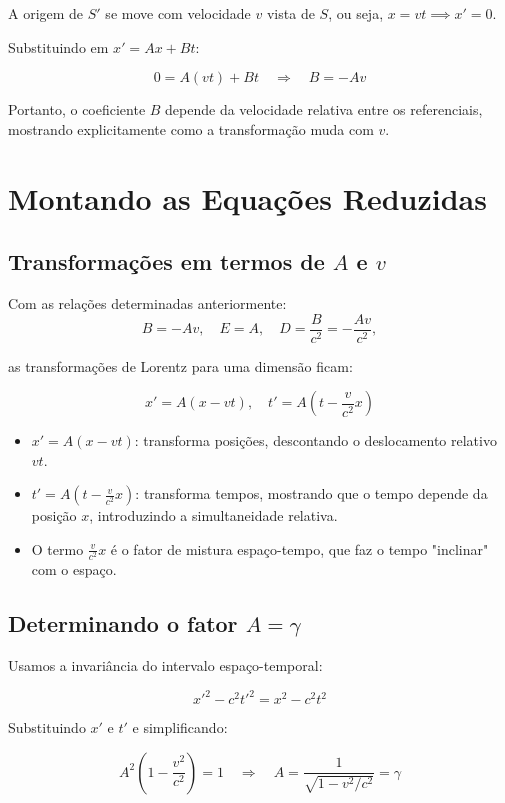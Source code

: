 \documentclass[12pt,a4paper]{article}
\begin{document}
A origem de $S'$ se move com velocidade $v$ vista de $S$, ou seja, $x = v t \implies x' = 0$.  

Substituindo em $x' = A x + B t$:

\[
0 = A (v t) + B t \quad \Rightarrow \quad B = - A v
\]

Portanto, o coeficiente $B$ depende da velocidade relativa entre os referenciais, mostrando explicitamente como a transformação muda com $v$.

\section{Montando as Equações Reduzidas}

\subsection{Transformações em termos de $A$ e $v$}

Com as relações determinadas anteriormente:
\[
B = -A v, \quad E = A, \quad D = \frac{B}{c^2} = -\frac{A v}{c^2},
\]

as transformações de Lorentz para uma dimensão ficam:

\[
x' = A (x - v t), \quad t' = A \left(t - \frac{v}{c^2} x \right)
\]

\begin{itemize}
    \item $x' = A (x - v t)$: transforma posições, descontando o deslocamento relativo $v t$.
    \item $t' = A \left(t - \frac{v}{c^2} x \right)$: transforma tempos, mostrando que o tempo depende da posição $x$, introduzindo a simultaneidade relativa.
    \item O termo $\frac{v}{c^2} x$ é o fator de mistura espaço-tempo, que faz o tempo "inclinar" com o espaço.
\end{itemize}

\subsection{Determinando o fator $A = \gamma$}

Usamos a invariância do intervalo espaço-temporal:

\[
x'^2 - c^2 t'^2 = x^2 - c^2 t^2
\]

Substituindo $x'$ e $t'$ e simplificando:

\[
A^2 \left(1 - \frac{v^2}{c^2}\right) = 1 \quad \Rightarrow \quad A = \frac{1}{\sqrt{1 - v^2/c^2}} = \gamma
\]
\end{document}
